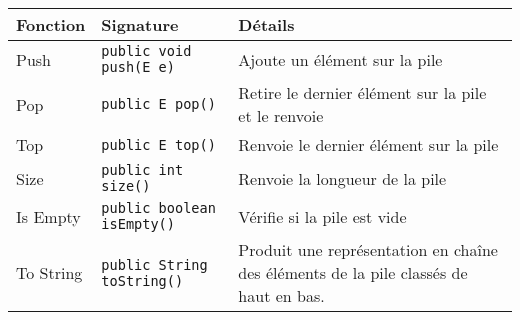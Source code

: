 \documentclass[10pt]{report}
\begin{document}
  \begin{table}[H]

    \begin{center}
      \renewcommand{\arraystretch}{1.5}
      \selectfont
      \footnotesize
          \begin{tabular}{p{2cm} p{4cm} p{4cm}}
          \arrayrulecolor{blue}\hline
          \rowcolor{draculawhite-background}
          \textcolor{myb}{Fonction} & 
          \textcolor{myb}{Signature} & 
          \textcolor{myb}{Détails}  
          \\
          \hline
          \arrayrulecolor{black}
          Push   & 
          \texttt{public void push(E e)}  
                 &
          Ajoute un élément sur la pile 
          \\
          \hline
          Pop   &  
          \texttt{public E pop()}  
                &
          Retire le dernier élément sur la pile et le renvoie
          \\
          \hline
          Top  &
          \texttt{public E top()} 
               &
          Renvoie le dernier élément sur la pile
          \\ 
          \hline
          Size & 
          \texttt{public int size()}  
               &
          Renvoie la longueur de la pile
          \\
          \hline 
          Is Empty & 
          \texttt{public boolean isEmpty()}  
                   &
          Vérifie si la pile est vide
          \\
          \hline 
          To String & 
          \texttt{public String toString()}  
                    &
          Produit une représentation en chaîne des éléments 
          de la pile classés de haut en bas. 
          \\ 
          \hline
          \end{tabular}
  \end{center}
  \end{table}
  \vspace{-1em}
\end{document}
